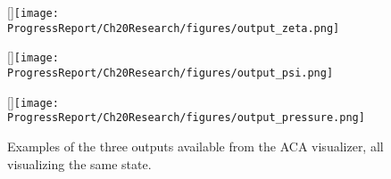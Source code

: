 \begin{figure}[ht]
    \centering
    [\linewidth]{\texttt{[image: ProgressReport/Ch20Research/figures/output\_zeta.png]}
    }
    
    [\linewidth]{\texttt{[image: ProgressReport/Ch20Research/figures/output\_psi.png]}
    }
    
    [\linewidth]{\texttt{[image: ProgressReport/Ch20Research/figures/output\_pressure.png]}
    }
    \caption{Examples of the three outputs available from the ACA visualizer, all visualizing the same state.}%
    \label{fig:ppms}
\end{figure}
